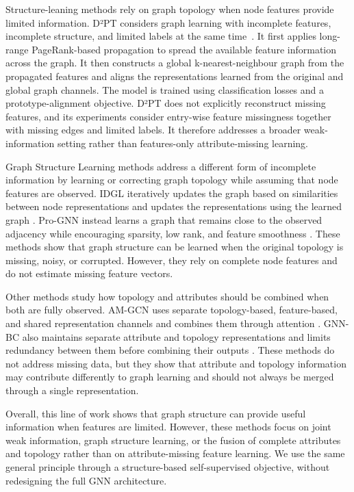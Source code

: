 Structure-leaning methods rely on graph topology when node features provide limited information. D²PT considers graph learning with incomplete features, incomplete structure, and limited labels at the same time~\cite{liu2023learning}. It first applies long-range PageRank-based propagation to spread the available feature information across the graph. It then constructs a global k-nearest-neighbour graph from the propagated features and aligns the representations learned from the original and global graph channels. The model is trained using classification losses and a prototype-alignment objective. D²PT does not explicitly reconstruct missing features, and its experiments consider entry-wise feature missingness together with missing edges and limited labels. It therefore addresses a broader weak-information setting rather than features-only attribute-missing learning.

Graph Structure Learning methods address a different form of incomplete information by learning or correcting graph topology while assuming that node features are observed. IDGL iteratively updates the graph based on similarities between node representations and updates the representations using the learned graph \cite{chen2020iterative}. Pro-GNN instead learns a graph that remains close to the observed adjacency while encouraging sparsity, low rank, and feature smoothness \cite{jin2020graph}. These methods show that graph structure can be learned when the original topology is missing, noisy, or corrupted. However, they rely on complete node features and do not estimate missing feature vectors.

Other methods study how topology and attributes should be combined when both are fully observed. AM-GCN uses separate topology-based, feature-based, and shared representation channels and combines them through attention \cite{wang2020gcn}. GNN-BC also maintains separate attribute and topology representations and limits redundancy between them before combining their outputs \cite{yang2022graph}. These methods do not address missing data, but they show that attribute and topology information may contribute differently to graph learning and should not always be merged through a single representation.

Overall, this line of work shows that graph structure can provide useful information when features are limited. However, these methods focus on joint weak information, graph structure learning, or the fusion of complete attributes and topology rather than on attribute-missing feature learning. We use the same general principle through a structure-based self-supervised objective, without redesigning the full GNN architecture.


